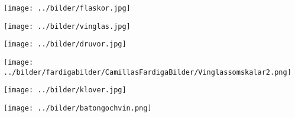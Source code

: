 %



\sclearpage

\sclearpage

\begin{intersong}
\begin{center}
\texttt{[image: ../bilder/flaskor.jpg]} 
\end{center}
\end{intersong}
\sclearpage


\begin{intersong}
\begin{center}
\texttt{[image: ../bilder/vinglas.jpg]} 
\end{center}
\end{intersong}
\sclearpage


\sclearpage

\sclearpage


\begin{intersong}
\begin{center}
\texttt{[image: ../bilder/druvor.jpg]} 
\end{center}
\end{intersong}
\sclearpage

\begin{intersong}
	\begin{center}
		\texttt{[image: ../bilder/fardigabilder/CamillasFardigaBilder/Vinglassomskalar2.png]} 
	\end{center}
\end{intersong}
\sclearpage

\begin{intersong}
	\begin{center}
		\texttt{[image: ../bilder/klover.jpg]} 
	\end{center}
\end{intersong}

\begin{intersong}
	\begin{center}
		\texttt{[image: ../bilder/batongochvin.png]} 
	\end{center}
\end{intersong}